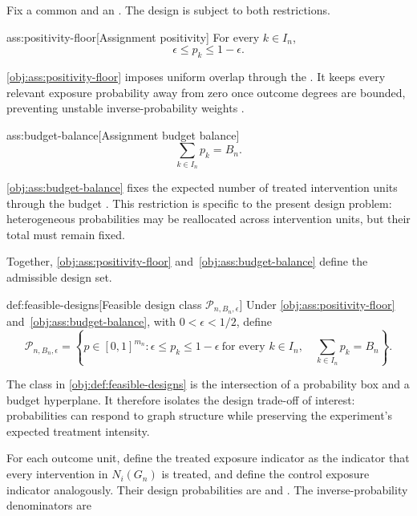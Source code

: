 \documentclass[11pt]{article}
\begin{document}
Fix a common  and an . The design is subject to both restrictions.

\begin{assumptionv}{ass:positivity-floor}[Assignment positivity]
For every $k\in I_n$,
\[
\epsilon\leq p_k\leq 1-\epsilon.
\]
\end{assumptionv}

\cref{obj:ass:positivity-floor} imposes uniform overlap through the . It keeps every relevant exposure probability away from zero once outcome degrees are bounded, preventing unstable inverse-probability weights \citep{Leung2019ApproxNeighborhoodInterference}.

\begin{assumptionv}{ass:budget-balance}[Assignment budget balance]
\[
\sum_{k\in I_n}p_k=B_n.
\]
\end{assumptionv}

\cref{obj:ass:budget-balance} fixes the expected number of treated intervention units through the budget . This restriction is specific to the present design problem: heterogeneous probabilities may be reallocated across intervention units, but their total must remain fixed.

Together, \cref{obj:ass:positivity-floor} and~\cref{obj:ass:budget-balance} define the admissible design set.

\begin{definitionv}{def:feasible-designs}[Feasible design class $\mathcal P_{n,B_n,\epsilon}$]
Under \cref{obj:ass:positivity-floor} and~\cref{obj:ass:budget-balance}, with \(0<\epsilon<1/2\), define
\[
\mathcal P_{n,B_n,\epsilon}
=
\left\{
p\in[0,1]^{m_n}:
\epsilon\le p_k\le 1-\epsilon\ \text{for every } k\in I_n,
\quad
\sum_{k\in I_n}p_k=B_n
\right\}.
\]
\end{definitionv}

The class in \cref{obj:def:feasible-designs} is the intersection of a probability box and a budget hyperplane. It therefore isolates the design trade-off of interest: probabilities can respond to graph structure while preserving the experiment's expected treatment intensity.

For each outcome unit, define the treated exposure indicator  as the indicator that every intervention in \(N_i(G_n)\) is treated, and define the control exposure indicator  analogously. Their design probabilities are  and . The inverse-probability denominators are
\end{document}
